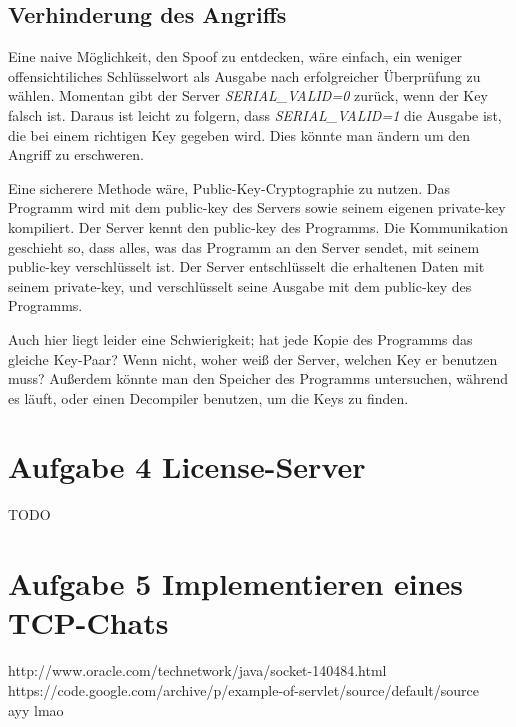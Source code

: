 \documentclass[10pt,a4paper]{article}
\begin{document}
\subsection{Verhinderung des Angriffs}
Eine naive Möglichkeit, den Spoof zu entdecken, wäre einfach, ein weniger offensichtiliches
Schlüsselwort als Ausgabe nach erfolgreicher Überprüfung zu wählen. Momentan gibt
der Server \textit{SERIAL\_VALID=0} zurück, wenn der Key falsch ist.
Daraus ist leicht zu folgern, dass \textit{SERIAL\_VALID=1} die Ausgabe ist, die
bei einem richtigen Key gegeben wird. Dies könnte man ändern um den Angriff
zu erschweren.

Eine sicherere Methode wäre, Public-Key-Cryptographie zu nutzen. Das Programm wird
mit dem public-key des Servers sowie seinem eigenen private-key kompiliert.
Der Server kennt den public-key des Programms. Die Kommunikation geschieht so,
dass alles, was das Programm an den Server sendet, mit seinem public-key verschlüsselt ist.
Der Server entschlüsselt die erhaltenen Daten mit seinem private-key, und
verschlüsselt seine Ausgabe mit dem public-key des Programms.

Auch hier liegt leider eine Schwierigkeit; hat jede Kopie des Programms das gleiche
Key-Paar? Wenn nicht, woher weiß der Server, welchen Key er benutzen muss?
Außerdem könnte man den Speicher des Programms untersuchen, während es läuft,
oder einen Decompiler benutzen, um die Keys zu finden.

\section{Aufgabe 4 License-Server}
TODO

\section{Aufgabe 5 Implementieren eines TCP-Chats}
http://www.oracle.com/technetwork/java/socket-140484.html \\
https://code.google.com/archive/p/example-of-servlet/source/default/source \\
ayy lmao
\end{document}
